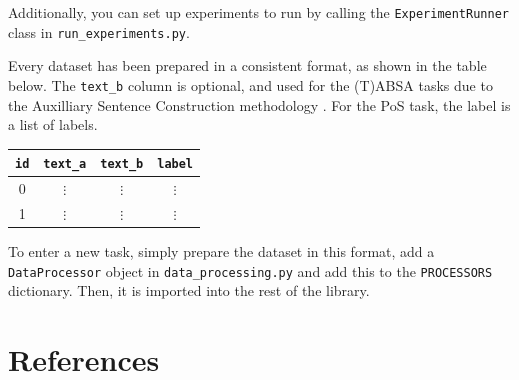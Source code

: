 \documentclass[11pt]{report}
\theoremstyle{Definition}
\theoremstyle{remark}
\begin{document}
Additionally, you can set up experiments to run by calling the \texttt{ExperimentRunner} class in \texttt{run\_experiments.py}.

Every dataset has been prepared in a consistent format, as shown in the table below. The \texttt{text\_b} column is optional, and used for the (T)ABSA tasks due to the Auxilliary Sentence Construction methodology \cite{Sun2019}. For the PoS task, the label is a list of labels.

\begin{center}
	\begin{tabular}{||c |c|c| c||} 
		\hline
		\texttt{id} & \texttt{text\_a} & \texttt{text\_b} & \texttt{label}  \\
		\hline\hline
		0 & $\vdots$ & $\vdots$ & $\vdots$ \\ 
		\hline
		1 & $\vdots$ & $\vdots$ & $\vdots$ \\ 
	\end{tabular}
	\label{table:appendix:datasetformat}
\end{center}

To enter a new task, simply prepare the dataset in this format, add a \texttt{DataProcessor} object in \texttt{data\_processing.py} and add this to the \texttt{PROCESSORS} dictionary. Then, it is imported into the rest of the library.

\newpage
{}
\chapter*{References}
\printbibliography[notkeyword={multitask}, notkeyword={meta}, title={General}, heading=secbib]
\printbibliography[keyword={multitask}, title={Multitask Learning}, heading=secbib]
\printbibliography[keyword={meta}, title={Meta Learning}, heading=secbib]
\end{document}
